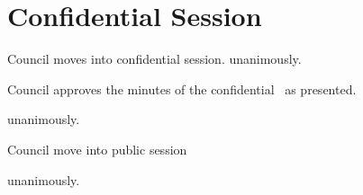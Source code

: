 \section*{Confidential Session}

\begin{motion}
    \birt Council moves into confidential session. 
    \movers{}{}
    \carries unanimously.
\end{motion}

\begin{motion}
    \birt Council approves the minutes of the confidential \blank\ as presented.
    \movers{}{}

    \carries unanimously.
\end{motion}

\begin{motion}
    \birt Council move into public session
    \movers{}{}

    \carries unanimously. 
\end{motion}
